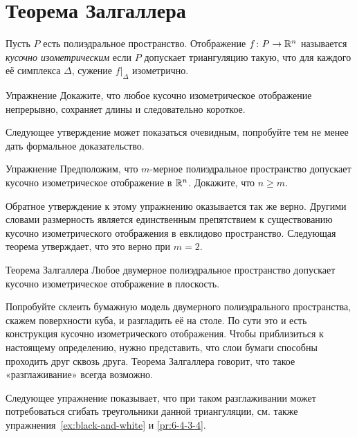 \section{Теорема Залгаллера}

Пусть $P$ есть полиэдральное пространство.
Отображение $f\colon P\to\mathbb{R}^n$ называется \emph{кусочно изометрическим} если $P$ допускает триангуляцию такую, что 
для каждого её симплекса $\Delta$, 
сужение $f|_\Delta$ изометрично.

\begin{thm}{Упражнение}\label{ex:PDP=>cont}
Докажите, что любое кусочно изометрическое отображение непрерывно, сохраняет длины и следовательно короткое.
\end{thm}

Следующее утверждение может показаться очевидным,
попробуйте тем не менее дать формальное доказательство. 

\begin{thm}{Упражнение}\label{ex:n=<m}
Предположим, что
$m$-мерное полиэдральное пространство допускает кусочно изометрическое отображение в $\mathbb{R}^n$.
Докажите, что $n\ge m$.
\end{thm}

Обратное утверждение к этому упражнению оказывается так же верно. 
Другими словами размерность является единственным препятствием к существованию кусочно изометрического отображения в евклидово пространство.
Следующая теорема утверждает, что это верно при $m=2$.

\begin{thm}{Теорема Залгаллера}\label{thm:zalgaller}
Любое двумерное полиэдральное пространство допускает кусочно изометрическое отображение в плоскость.
\end{thm}

Попробуйте склеить бумажную модель двумерного полиэдрального пространства, 
скажем поверхности куба, и разгладить её на столе.
По сути это и есть конструкция кусочно изометрического отображения.
Чтобы приблизиться к настоящему определению, 
нужно представить, что слои бумаги способны проходить друг сквозь друга.
Теорема Залгаллера говорит, что такое «разглаживание» всегда возможно.
  
Следующее упражнение показывает, что при таком разглаживании 
может потребоваться сгибать треугольники данной триангуляции,
см. также упражнения~\ref{ex:black-and-white} и \ref{pr:6-4-3-4}.

